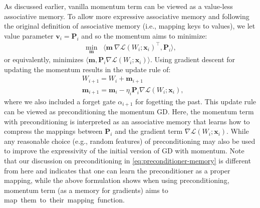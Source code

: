 \documentclass{article}
\newcommand{\vv}{\mathbf{v}}
\newcommand{\inner}[2]{\langle #1, #2 \rangle}
\newcommand{\head}[1]{\vspace{1.7mm}\noindent{{\textcolor{c4}{\bf #1.}}}}
\renewcommand{\vv}{\boldsymbol{v}}
\newcommand{\vm}{\boldsymbol{m}}
\newcommand{\vp}{\boldsymbol{P}}
\begin{document}
\head{Extension: More Expressive Association}
As discussed earlier, vanilla momentum term can be viewed as a value-less associative memory. 
To allow more expressive associative memory  and following the original definition of associative memory (i.e., mapping keys to values), we {let value parameter $\vv_i = \vp_i$} and so the momentum aims to minimize:
\begin{align}
    \min_{\vm}\;\;\inner{\vm \: \nabla \mathcal{L}(W_i;\boldsymbol{x}_i)^{\top}}{\vp_i},
\end{align}
or equivalently, minimizes $\langle \vm, \vp_i  \nabla \mathcal{L}(W_i;\boldsymbol{x}_i)\rangle$.  Using gradient descent for updating the momentum
results in the update rule of:
\begin{align}\nonumber
    &W_{i+1} = W_i + \mathbf{m}_{i+1}\\ \label{eq:momentum-p}
    &\mathbf{m}_{i+1} =   \mathbf{m}_{i} - \eta_i \vp_i  \nabla \mathcal{L}\left(W_{i};\boldsymbol{x}_i\right),
\end{align}
where we also included a forget gate $\alpha_{i+1}$ for fogetting the past.
This update rule can be viewed as preconditioning the momentum GD. Here,  the momentum term with preconditioning is interpreted as an associative memory that learns how to compress the mappings between $\vp_i$ and the gradient term $\nabla \mathcal{L}(W_i;\boldsymbol{x}_i)$. 
While any reasonable choice (e.g., random features) of preconditioning may also be used to improve the expressivity of the initial version of GD with momentum. 
Note that our discussion on preconditioning in \autoref{eq:preconditioner-memory} is different from here and indicates that one can learn the preconditioner as a proper mapping, while the above formulation shows when using preconditioning, momentum term (as a memory for gradients) aims to map~them~to~their~mapping~function. 
\end{document}
